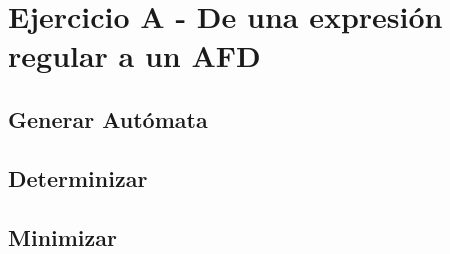 \section{Ejercicio A - De una expresión regular a un AFD}

\subsection{Generar Autómata}

\subsection{Determinizar}

\subsection{Minimizar}

